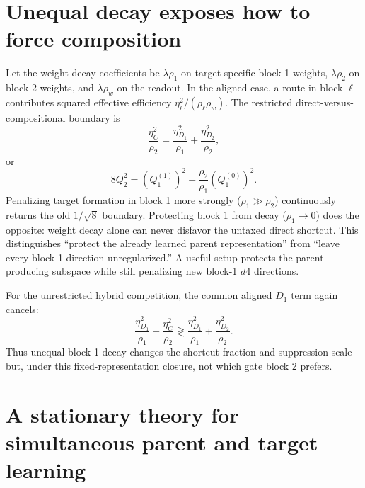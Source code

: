 \documentclass[11pt]{article}
\newcommand{\eone}{\eta_{D_1}}
\newcommand{\etwo}{\eta_{D_2}}
\newcommand{\ecomp}{\eta_C}
\begin{document}
\section{Unequal decay exposes how to force composition}

Let the weight-decay coefficients be \(\lambda\rho_1\) on target-specific block-1 weights,
\(\lambda\rho_2\) on block-2 weights, and \(\lambda\rho_w\) on the readout.  In the aligned
case, a route in block \(\ell\) contributes squared effective efficiency
\(\eta_\ell^2/(\rho_\ell\rho_w)\).  The restricted direct-versus-compositional boundary is
\begin{equation}
\frac{\ecomp^2}{\rho_2}
=\frac{\eone^2}{\rho_1}+\frac{\etwo^2}{\rho_2},
\end{equation}
or
\begin{equation}
\boxed{
8Q_2^2=(Q_1^{(1)})^2+\frac{\rho_2}{\rho_1}(Q_1^{(0)})^2.}
\label{eq:unequal-decay}
\end{equation}
Penalizing target formation in block 1 more strongly (\(\rho_1\gg\rho_2\)) continuously
returns the old \(1/\sqrt8\) boundary.  Protecting block 1 from decay
(\(\rho_1\to0\)) does the opposite: weight decay alone can never disfavor the untaxed direct
shortcut.  This distinguishes ``protect the already learned parent representation'' from
``leave every block-1 direction unregularized.''  A useful setup protects the parent-producing
subspace while still penalizing new block-1 \(d4\) directions.

For the unrestricted hybrid competition, the common aligned \(D_1\) term again cancels:
\begin{equation}
\frac{\eone^2}{\rho_1}+\frac{\ecomp^2}{\rho_2}
\gtrless
\frac{\eone^2}{\rho_1}+\frac{\etwo^2}{\rho_2}.
\end{equation}
Thus unequal block-1 decay changes the shortcut fraction and suppression scale but, under this
fixed-representation closure, not which gate block 2 prefers.

\section{A stationary theory for simultaneous parent and target learning}
\end{document}
